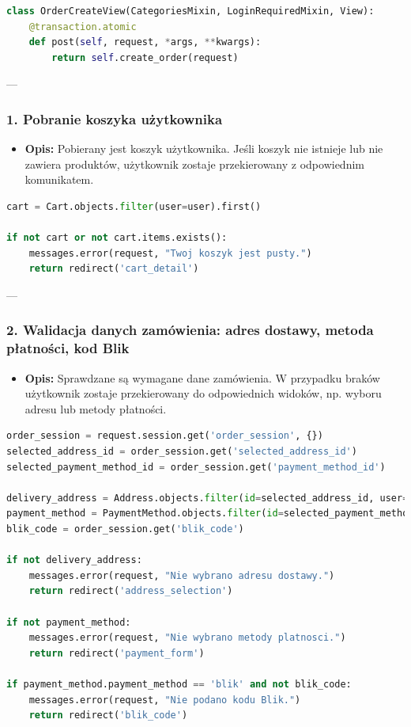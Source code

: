 \documentclass[12pt,a4paper,oneside]{article}
\theoremstyle{definition}
\numberwithin{equation}{section}
\begin{document}
\begin{lstlisting}[language=Python, caption=Metoda post()]
class OrderCreateView(CategoriesMixin, LoginRequiredMixin, View):
    @transaction.atomic
    def post(self, request, *args, **kwargs):
        return self.create_order(request)
\end{lstlisting}

---

\subsubsection*{1. Pobranie koszyka użytkownika}
\begin{itemize}
    \item \textbf{Opis:} Pobierany jest koszyk użytkownika. Jeśli koszyk nie istnieje lub nie zawiera produktów, użytkownik zostaje przekierowany z odpowiednim komunikatem.
\end{itemize}

\begin{lstlisting}[language=Python]
cart = Cart.objects.filter(user=user).first()

if not cart or not cart.items.exists():
    messages.error(request, "Twoj koszyk jest pusty.")
    return redirect('cart_detail')
\end{lstlisting}

---

\subsubsection*{2. Walidacja danych zamówienia: adres dostawy, metoda płatności, kod Blik}
\begin{itemize}
    \item \textbf{Opis:} Sprawdzane są wymagane dane zamówienia. W przypadku braków użytkownik zostaje przekierowany do odpowiednich widoków, np. wyboru adresu lub metody płatności.
\end{itemize}

\begin{lstlisting}[language=Python]
order_session = request.session.get('order_session', {})
selected_address_id = order_session.get('selected_address_id')
selected_payment_method_id = order_session.get('payment_method_id')

delivery_address = Address.objects.filter(id=selected_address_id, user=user).first()
payment_method = PaymentMethod.objects.filter(id=selected_payment_method_id, user=user).first()
blik_code = order_session.get('blik_code')

if not delivery_address:
    messages.error(request, "Nie wybrano adresu dostawy.")
    return redirect('address_selection')

if not payment_method:
    messages.error(request, "Nie wybrano metody platnosci.")
    return redirect('payment_form')

if payment_method.payment_method == 'blik' and not blik_code:
    messages.error(request, "Nie podano kodu Blik.")
    return redirect('blik_code')
\end{lstlisting}
\end{document}

